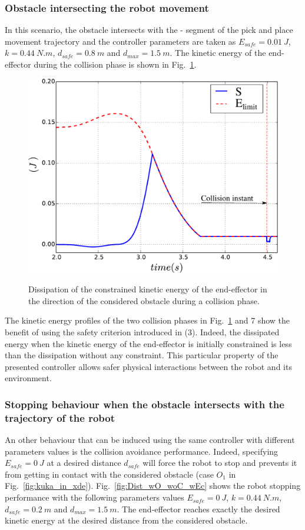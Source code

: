 \documentclass[a4paper, 10pt, conference]{ieeeconf}      %
\newcommand*\circled[1]{\tikz[baseline=(char.base)]{
            \node[shape=circle,draw,inner sep=0.5pt] (char) {#1};}}
\begin{document}
\subsubsection{Obstacle intersecting the robot movement}
In this scenario, the obstacle intersects with the \circled{2}-\circled{3} segment of the pick and place movement trajectory and the controller parameters are taken as  $E_{safe} = 0.01~J$, $k = 0.44~N.m$, $d_{safe} = 0.8~m$ and $d_{max} = 1.5~m$. The kinetic energy of the end-effector during the collision phase is shown in Fig.~\ref{fig:kE_wO_wC_wEc}.
 
\begin{figure}[h]
\centering
{\includegraphics[width=0.9\columnwidth]{figures/kE_wO_wC_wEc}}
\caption{Dissipation of the constrained kinetic energy of the end-effector in the direction of the considered obstacle during a collision phase.} 
\label{fig:kE_wO_wC_wEc}
\end{figure}

The kinetic energy profiles of the two collision phases in Fig.~\ref{fig:kE_wO_wC_wEc} and 7 show the benefit of using the safety criterion introduced in (3). Indeed, the dissipated energy when the kinetic energy of the end-effector is initially constrained is less than the dissipation without any constraint. This particular property of the presented controller allows safer physical interactions between the robot and its environment.   
 
\subsubsection{Stopping behaviour when the obstacle intersects with the trajectory of the robot}
An other behaviour that can be induced using the same controller with different parameters values is the collision avoidance performance. Indeed, specifying $E_{safe} = 0~J$ at a desired distance $d_{safe}$ will force the robot to stop and prevents it from getting in contact with the considered obstacle (case $O_1$ in Fig.~\ref{fig:kuka_in_xde}). Fig.~\ref{fig:Dist_wO_woC_wEc} shows the robot stopping performance with the following parameters values $E_{safe} = 0~J$, $k = 0.44~N.m$, $d_{safe} = 0.2~m$ and $d_{max} = 1.5~m$. The end-effector reaches exactly the desired kinetic energy at the desired distance from the considered obstacle.
\end{document}
